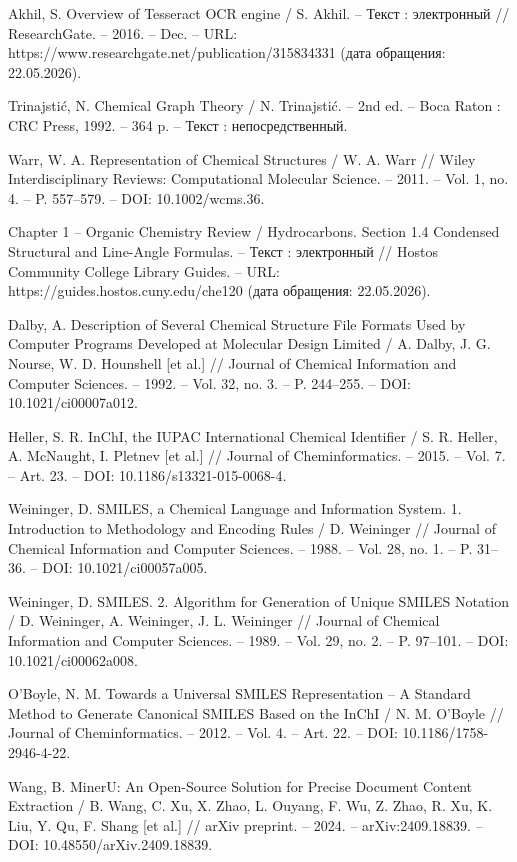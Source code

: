 Akhil, S. Overview of Tesseract OCR engine / S. Akhil. – Текст : электронный // ResearchGate. – 2016. – Dec. – URL: https://www.researchgate.net/publication/315834331 (дата обращения: 22.05.2026).

Trinajstić, N. Chemical Graph Theory / N. Trinajstić. – 2nd ed. – Boca Raton : CRC Press, 1992. – 364 p. – Текст : непосредственный.

Warr, W. A. Representation of Chemical Structures / W. A. Warr // Wiley Interdisciplinary Reviews: Computational Molecular Science. – 2011. – Vol. 1, no. 4. – P. 557–579. – DOI: 10.1002/wcms.36.

Chapter 1 -- Organic Chemistry Review / Hydrocarbons. Section 1.4 Condensed Structural and Line-Angle Formulas. – Текст : электронный // Hostos Community College Library Guides. – URL: https://guides.hostos.cuny.edu/che120 (дата обращения: 22.05.2026).

Dalby, A. Description of Several Chemical Structure File Formats Used by Computer Programs Developed at Molecular Design Limited / A. Dalby, J. G. Nourse, W. D. Hounshell [et al.] // Journal of Chemical Information and Computer Sciences. – 1992. – Vol. 32, no. 3. – P. 244–255. – DOI: 10.1021/ci00007a012.

Heller, S. R. InChI, the IUPAC International Chemical Identifier / S. R. Heller, A. McNaught, I. Pletnev [et al.] // Journal of Cheminformatics. – 2015. – Vol. 7. – Art. 23. – DOI: 10.1186/s13321-015-0068-4.

Weininger, D. SMILES, a Chemical Language and Information System. 1. Introduction to Methodology and Encoding Rules / D. Weininger // Journal of Chemical Information and Computer Sciences. – 1988. – Vol. 28, no. 1. – P. 31–36. – DOI: 10.1021/ci00057a005.

Weininger, D. SMILES. 2. Algorithm for Generation of Unique SMILES Notation / D. Weininger, A. Weininger, J. L. Weininger // Journal of Chemical Information and Computer Sciences. – 1989. – Vol. 29, no. 2. – P. 97–101. – DOI: 10.1021/ci00062a008.

O'Boyle, N. M. Towards a Universal SMILES Representation – A Standard Method to Generate Canonical SMILES Based on the InChI / N. M. O'Boyle // Journal of Cheminformatics. – 2012. – Vol. 4. – Art. 22. – DOI: 10.1186/1758-2946-4-22.

Wang, B. MinerU: An Open-Source Solution for Precise Document Content Extraction / B. Wang, C. Xu, X. Zhao, L. Ouyang, F. Wu, Z. Zhao, R. Xu, K. Liu, Y. Qu, F. Shang [et al.] // arXiv preprint. – 2024. – arXiv:2409.18839. – DOI: 10.48550/arXiv.2409.18839.

